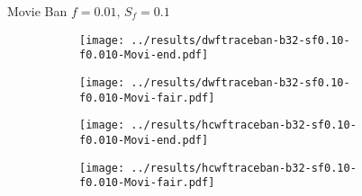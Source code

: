 \documentclass[10pt,a4paper]{beamer}
\begin{document}
\begin{frame}{Movie Ban $f=0.01,\, S_f=0.1$}
	\begin{figure}
		\begin{subfigure}{.48\textwidth}
			\centering
			\texttt{[image: ../results/dwftraceban-b32-sf0.10-f0.010-Movi-end.pdf]}
		\end{subfigure}
		\begin{subfigure}{.48\textwidth}
			\centering
			\texttt{[image: ../results/dwftraceban-b32-sf0.10-f0.010-Movi-fair.pdf]}
		\end{subfigure}
	\end{figure}

	\begin{figure}
		\begin{subfigure}{.48\textwidth}
			\centering
			\texttt{[image: ../results/hcwftraceban-b32-sf0.10-f0.010-Movi-end.pdf]}
		\end{subfigure}
		\begin{subfigure}{.48\textwidth}
			\centering
			\texttt{[image: ../results/hcwftraceban-b32-sf0.10-f0.010-Movi-fair.pdf]}
		\end{subfigure}
	\end{figure}
\end{frame}



%
\end{document}
